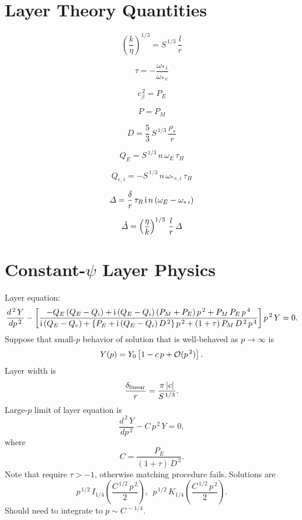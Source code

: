 \documentclass[notitlepage,12pt]{article}
\begin{document}
\section{Layer Theory Quantities}
\begin{description}
\item 
$$
\left(\frac{k}{\eta}\right)^{1/3} = S^{\,1/3}\,\frac{l}{r}
$$
\item
$$
\tau = -\frac{\omega_{\ast\,i}}{\omega_{\ast\,e}}
$$
\item
$$
 c_\beta^{\,2} = P_E
 $$
 \item
 $$
 P=P_M
 $$
\item 
$$
D= \frac{5}{3}\,S^{\,1/3}\,\frac{\rho_s}{r}
$$ 
\item 
$$
Q_E= S^{\,1/3}\,n\,\omega_E\,\tau_H
$$
\item 
$$
Q_{e,i}= -S^{\,1/3}\,n\,\omega_{\ast\,e,i}\,\tau_H
$$
\item 
$$
{\mit\Delta} = \frac{\delta}{r}\,\tau_R\,{\rm i}\,n\,(\omega_E-\omega_{\ast\,i})
$$
\item 
$$
\hat{\mit\Delta} = \left(\frac{\eta}{k}\right)^{1/3} \,\frac{l}{r}\,{\mit\Delta}
$$

\section{Constant-$\psi$ Layer Physics}
Layer equation:
$$
\frac{d^{\,2}\,Y}{dp^{\,2}} -\left[\frac{-Q_E\,(Q_E-Q_i)+{\rm i}\,(Q_E-Q_i)\,(P_M+P_E)\,p^{\,2}+
P_M\,P_E\,p^{\,4}}
{{\rm i}\,(Q_E-Q_e) +\{P_E + {\rm i}\,(Q_E-Q_i)\,D^{\,2}\}\,p^{\,2}+(1+\tau)\,P_M\,D^{\,2}\,p^{\,4}}
\right] p^{\,2}\, Y = 0.
$$
Suppose that small-$p$ behavior of solution that is well-behaved as $p\rightarrow \infty$ is
$$
Y(p) = Y_0\left[1 - c\,p+{\cal O}(p^{\,2})\right].
$$
Layer width is 
$$
\frac{\delta_{\rm linear}}{r} = \frac{\pi\,|c|}{S^{\,1/3}}.
$$
Large-$p$ limit of layer equation
is
$$
\frac{d^{\,2}\,Y}{dp^{\,2}} - C\, p^{\,2}\, Y = 0,
$$
where
$$
C = \frac{P_E}{(1+\tau)\,D^{\,2}}.
$$
Note that require $\tau>-1$, otherwise matching procedure fails. 
Solutions are
$$
p^{\,1/2}\,I_{1/4}\left(\frac{C^{\,1/2}\,p^{\,2}}{2}\right),~~ p^{\,1/2}\,K_{1/4}\left(\frac{C^{\,1/2}\,p^{\,2}}{2}\right).
$$
Should need to integrate to $p\sim C^{\,-1/4}$. 



\end{description}
\end{document}
